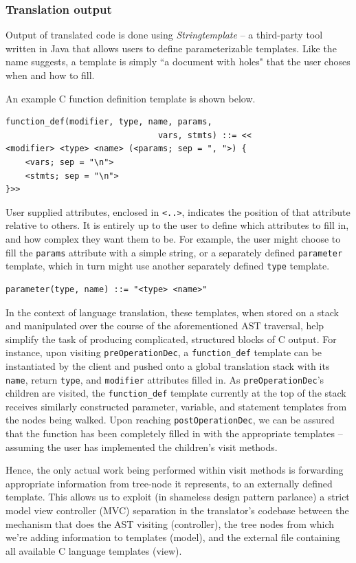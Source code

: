 \documentclass{sig-alternate}
\begin{document}
\subsubsection{Translation output}
Output of translated code is done using \textit{Stringtemplate} -- a third-party tool written in Java that allows users to define parameterizable templates. Like the name suggests, a template is simply ``a document with holes" that the user choses when and how to fill. 

An example C function definition template is shown below.

\begin{verbatim}
function_def(modifier, type, name, params, 
                               vars, stmts) ::= <<
<modifier> <type> <name> (<params; sep = ", ">) {
    <vars; sep = "\n">
    <stmts; sep = "\n">
}>>
\end{verbatim}

User supplied attributes, enclosed in \texttt{<..>}, indicates the position of that attribute relative to others. It is entirely up to the user to define which attributes to fill in, and how complex they want them to be. For example, the user might choose to fill the \texttt{params} attribute with a simple string, or a separately defined \texttt{parameter} template, which in turn might use another separately defined \texttt{type} template.

\begin{verbatim}
parameter(type, name) ::= "<type> <name>"
\end{verbatim}

In the context of language translation, these templates, when stored on a stack and manipulated over the course of the aforementioned AST traversal, help simplify the task of producing complicated, structured blocks of C output. For instance, upon visiting \texttt{preOperationDec}, a \texttt{function\_def} template can be instantiated by the client and pushed onto a global translation stack with its \texttt{name}, return \texttt{type}, and \texttt{modifier} attributes filled in. As \texttt{preOperationDec}'s children are visited, the \texttt{function\_def} template currently at the top of the stack receives similarly constructed parameter, variable, and statement templates from the nodes being walked. Upon reaching \texttt{postOperationDec}, we can be assured that the function has been completely filled in with the appropriate templates -- assuming the user has implemented the children's visit methods.

Hence, the only actual work being performed within visit methods is forwarding appropriate information from tree-node it represents, to an externally defined template. This allows us to exploit (in shameless design pattern parlance) a strict model view controller (MVC) separation in the translator's codebase between the mechanism that does the AST visiting (controller), the tree nodes from which we're adding information to templates (model), and the external file containing all available C language templates (view).
\end{document}
